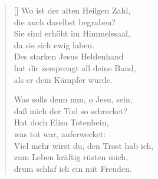 \begin{multicols}{2}
\begin{verse}[\versewidth]
 Wo ist der alten Heilgen Zahl,\\
die auch daselbst begraben?\\
Sie sind erhöht im Himmelssaal,\\
da sie sich ewig laben.\\
Des starken Jesus Heldenhand\\
hat dir zersprengt all deine Band,\\
als er dein Kämpfer wurde.

 Was solls denn nun, o Jesu, sein,\\
daß mich der Tod so schrecket?\\
Hat doch Elisa Totenbein,\\
was tot war, auferwecket:\\
Viel mehr wirst du, den Trost hab ich,\\
zum Leben kräftig rüsten mich,\\
drum schlaf ich ein mit Freuden.

\end{verse}
\end{multicols}
